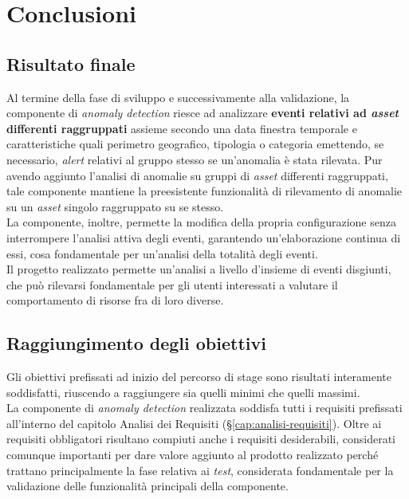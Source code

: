 
\chapter{Conclusioni}
\label{cap:conclusioni}


\section{Risultato finale}
Al termine della fase di sviluppo e successivamente alla validazione, la componente di \textit{anomaly detection} riesce ad analizzare \textbf{eventi relativi ad \textit{asset} differenti raggruppati} assieme secondo una data finestra temporale e caratteristiche quali perimetro geografico, tipologia o categoria emettendo, se necessario, \textit{alert} relativi al gruppo stesso se un'anomalia è stata rilevata. Pur avendo aggiunto l'analisi di anomalie su gruppi di \textit{asset} differenti raggruppati, tale componente mantiene la preesistente funzionalità di rilevamento di anomalie su un \textit{asset} singolo raggruppato su se stesso.\\
La componente, inoltre, permette la modifica della propria configurazione senza interrompere l'analisi attiva degli eventi, garantendo un'elaborazione continua di essi, cosa fondamentale per un'analisi della totalità degli eventi.\\
Il progetto realizzato permette un'analisi a livello d'insieme di eventi disgiunti, che può rilevarsi fondamentale per gli utenti interessati a valutare il comportamento di risorse fra di loro diverse.

\section{Raggiungimento degli obiettivi}
Gli obiettivi prefissati ad inizio del percorso di stage sono risultati interamente soddisfatti, riuscendo a raggiungere sia quelli minimi che quelli massimi.\\
La componente di \textit{anomaly detection} realizzata soddisfa tutti i requisiti prefissati all'interno del capitolo Analisi dei Requisiti (\S\ref{cap:analisi-requisiti}). Oltre ai requisiti obbligatori risultano compiuti anche i requisiti desiderabili, considerati comunque importanti per dare valore aggiunto al prodotto realizzato perché trattano principalmente la fase relativa ai \textit{test}, considerata fondamentale per la validazione delle funzionalità principali della componente.

